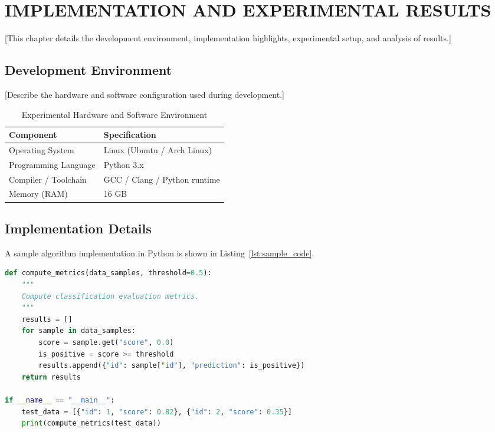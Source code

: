 \chapter{IMPLEMENTATION AND EXPERIMENTAL RESULTS}
\label{chap:implementation}

[This chapter details the development environment, implementation highlights, experimental setup, and analysis of results.]

\section{Development Environment}
\label{sec:environment}

[Describe the hardware and software configuration used during development.]

\begin{table}[H]
    \centering
    \caption{Experimental Hardware and Software Environment}
    \label{tab:sample_env}
    \begin{tabular}{|l|l|}
        \hline
        \textbf{Component} & \textbf{Specification} \\ \hline
        Operating System & Linux (Ubuntu / Arch Linux) \\ \hline
        Programming Language & Python 3.x \\ \hline
        Compiler / Toolchain & GCC / Clang / Python runtime \\ \hline
        Memory (RAM) & 16 GB \\ \hline
    \end{tabular}
\end{table}

\section{Implementation Details}
\label{sec:code_details}

A sample algorithm implementation in Python is shown in Listing~\ref{lst:sample_code}.

\begin{lstlisting}[language=Python, caption={Sample Algorithm Implementation}, label={lst:sample_code}]
def compute_metrics(data_samples, threshold=0.5):
    """
    Compute classification evaluation metrics.
    """
    results = []
    for sample in data_samples:
        score = sample.get("score", 0.0)
        is_positive = score >= threshold
        results.append({"id": sample["id"], "prediction": is_positive})
    return results

if __name__ == "__main__":
    test_data = [{"id": 1, "score": 0.82}, {"id": 2, "score": 0.35}]
    print(compute_metrics(test_data))
\end{lstlisting}

